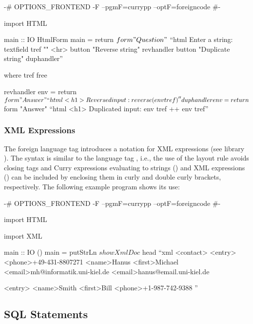 \begin{currynomath}
{-# OPTIONS_FRONTEND -F --pgmF=currypp --optF=foreigncode #-}

import HTML

main :: IO HtmlForm
main = return $ form "Question" $
         ``html
	     Enter a string: {{textfield tref ""}}
	     <hr>
             {{button "Reverse string"   revhandler}}
             {{button "Duplicate string" duphandler}}''

 where
  tref free

  revhandler env = return $ form "Answer"
    ``html <h1>Reversed input: {reverse (env tref)}''

  duphandler env = return $ form "Answer"
    ``html
       <h1>
         Duplicated input:
         {env tref ++ env tref}''
\end{currynomath}


\subsubsection{XML Expressions}

The foreign language tag  introduces a notation
for XML expressions (see \CYS library ).
The syntax is similar to the language tag ,
i.e., the use of the layout rule avoids closing tags
and Curry expressions evaluating to strings ()
and XML expressions () can be included by enclosing
them in curly and double curly brackets, respectively.
The following example program shows its use:
\begin{currynomath}
{-# OPTIONS_FRONTEND -F --pgmF=currypp --optF=foreigncode #-}

import HTML

import XML

main :: IO ()
main = putStrLn $ showXmlDoc $ head ``xml
 <contact>
  <entry>
   <phone>+49-431-8807271
   <name>Hanus
   <first>Michael
   <email>mh@informatik.uni-kiel.de
   <email>hanus@email.uni-kiel.de
   
  <entry>
   <name>Smith
   <first>Bill
   <phone>+1-987-742-9388
 ''
\end{currynomath}

\subsection{SQL Statements}
\label{sec:integratedsql}

